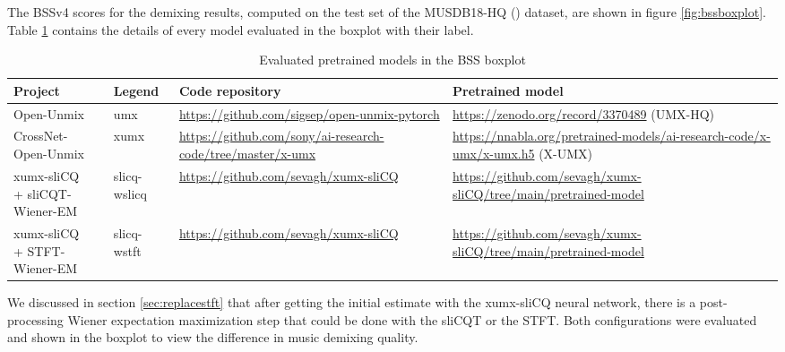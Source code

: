 \documentclass[report.tex]{subfiles}
\begin{document}
The BSSv4 scores for the demixing results, computed on the test set of the MUSDB18-HQ (\cite{musdb18hq}) dataset, are shown in figure \ref{fig:bssboxplot}. Table \ref{table:bsseval} contains the details of every model evaluated in the boxplot with their label.

\begin{table}[ht]
	\centering
	\begin{tabular}{ |l|l|p{4cm}|p{4cm}| }
	 \hline
	  Project & Legend & Code repository & Pretrained model \\
	 \hline
	 \hline
		\makecell[l]{Open-Unmix \\ \textcite{umx}} & umx & \url{https://github.com/sigsep/open-unmix-pytorch} & \url{https://zenodo.org/record/3370489} (UMX-HQ) \\
	 \hline
		\makecell[l]{CrossNet-Open-Unmix \\ \textcite{xumx}} & xumx & \url{https://github.com/sony/ai-research-code/tree/master/x-umx} & \url{https://nnabla.org/pretrained-models/ai-research-code/x-umx/x-umx.h5} (X-UMX) \\
	 \hline
		\makecell[l]{xumx-sliCQ \\ + sliCQT-Wiener-EM} & slicq-wslicq & \url{https://github.com/sevagh/xumx-sliCQ} & \url{https://github.com/sevagh/xumx-sliCQ/tree/main/pretrained-model} \\
	 \hline
		\makecell[l]{xumx-sliCQ \\ + STFT-Wiener-EM} & slicq-wstft & \url{https://github.com/sevagh/xumx-sliCQ} & \url{https://github.com/sevagh/xumx-sliCQ/tree/main/pretrained-model} \\
	 \hline
\end{tabular}
	\caption{Evaluated pretrained models in the BSS boxplot}
	\label{table:bsseval}
\end{table}

We discussed in section \ref{sec:replacestft} that after getting the initial estimate with the xumx-sliCQ neural network, there is a post-processing Wiener expectation maximization step that could be done with the sliCQT or the STFT. Both configurations were evaluated and shown in the boxplot to view the difference in music demixing quality.
\end{document}
